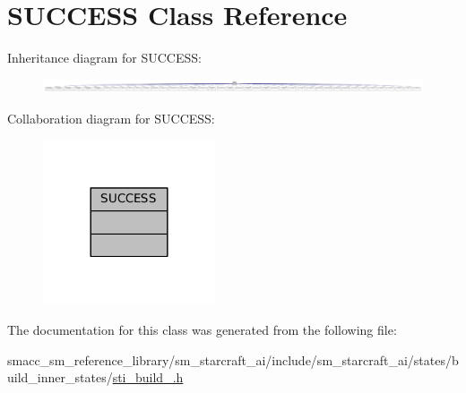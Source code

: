 \hypertarget{classSUCCESS}{}\section{S\+U\+C\+C\+E\+SS Class Reference}
\label{classSUCCESS}


Inheritance diagram for S\+U\+C\+C\+E\+SS\+:
\nopagebreak
\begin{figure}[H]
\begin{center}
\leavevmode
\includegraphics[width=350pt]{classSUCCESS__inherit__graph}
\end{center}
\end{figure}


Collaboration diagram for S\+U\+C\+C\+E\+SS\+:
\nopagebreak
\begin{figure}[H]
\begin{center}
\leavevmode
\includegraphics[width=144pt]{classSUCCESS__coll__graph}
\end{center}
\end{figure}


The documentation for this class was generated from the following file\+:\begin{DoxyCompactItemize}
\item 
smacc\+\_\+sm\+\_\+reference\+\_\+library/sm\+\_\+starcraft\+\_\+ai/include/sm\+\_\+starcraft\+\_\+ai/states/build\+\_\+inner\+\_\+states/\hyperlink{sti__build__2_8h}{sti\+\_\+build\+\_.\+h}\end{DoxyCompactItemize}
